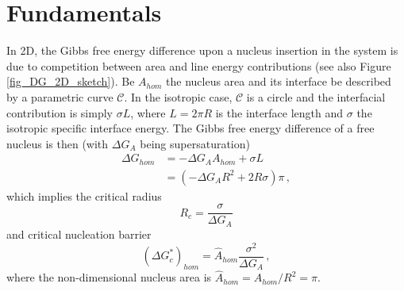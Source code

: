 %


\section{Fundamentals}
In 2D, the Gibbs free energy difference upon a nucleus insertion in the system is due to competition between area and line energy contributions (see also Figure \ref{fig_DG_2D_sketch}). Be $A_{hom}$ the nucleus area and its interface be described by a parametric curve $\mathcal{C}$. In the isotropic case, $\mathcal{C}$ is a circle and the interfacial contribution is simply $\sigma L$, where $L=2\pi R$ is the interface length and $\sigma$ the isotropic specific interface energy. The Gibbs free energy difference of a free nucleus is then (with $\Delta G_A$ being supersaturation)
\begin{align}
	\Delta G_{hom} &= -\Delta G_A A_{hom} + \sigma L \\
	\label{eq_DG_hom_iso}	&= (-\Delta G_A R^2 + 2R\sigma)\pi \,,
\end{align}
which implies the critical radius
\begin{equation} \label{eq_crit_radius_2D}
	R_c = \frac{\sigma}{\Delta G_A}
\end{equation}
and critical nucleation barrier
\begin{equation} \label{eq_nucl_barr_hom_2D}
	(\Delta G_c^*)_{hom} = \hat{A}_{hom}\frac{\sigma^2}{\Delta G_A}\,,
\end{equation}
where the non-dimensional nucleus area is $\hat{A}_{hom}=A_{hom}/R^2=\pi$.

